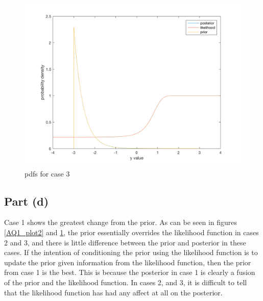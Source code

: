 \documentclass[11pt]{article}
\begin{document}
\begin{figure}[h!]
	\centering
	\includegraphics[width=0.6\linewidth]{AQ1_plot3.png}
	\caption{pdfs for case 3}
	\label{AQ1_plot3}
\end{figure}

\subsection*{Part (d)}
Case 1 shows the greatest change from the prior. As can be seen in figures \ref{AQ1_plot2} and \ref{AQ1_plot3}, the prior essentially overrides the likelihood function in cases 2 and 3, and there is little difference between the prior and posterior in these cases. If the intention of conditioning the prior using the likelihood function is to update the prior given information from the likelihood function, then the prior from case 1 is the best. This is because the posterior in case 1 is clearly a fusion of the prior and the likelihood function. In cases 2, and 3, it is difficult to tell that the likelihood function has had any affect at all on the posterior.
\end{document}
